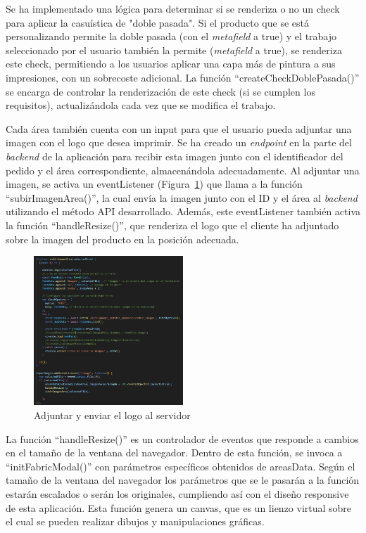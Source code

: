 \documentclass[11pt]{article}
\begin{document}
Se ha implementado una lógica para determinar si se renderiza o no un check para aplicar la casuística de "doble pasada". Si el producto que se está 
personalizando permite la doble pasada (con el \textit{metafield} a true) y el trabajo seleccionado por el usuario también la permite 
(\textit{metafield} a true), se renderiza este check, permitiendo a los usuarios aplicar una capa más de pintura a sus impresiones, 
con un sobrecoste adicional. La función ``createCheckDoblePasada()'' se encarga de controlar la renderización de este check (si se cumplen los requisitos), 
actualizándola cada vez que se modifica el trabajo.

Cada área también cuenta con un input para que el usuario pueda adjuntar una imagen con el logo que desea imprimir. Se ha creado un \textit{endpoint} en 
la parte del \textit{backend} de la aplicación para recibir esta imagen junto con el identificador del pedido y el área correspondiente, 
almacenándola adecuadamente. Al adjuntar una imagen, se activa un eventListener (Figura~\ref{fig:adjuntarLogo}) que llama a la función ``subirImagenArea()'', 
la cual envía la imagen junto con el ID y el área al \textit{backend} utilizando el método API desarrollado. Además, este eventListener 
también activa la función ``handleResize()'', que renderiza el logo que el cliente ha adjuntado sobre la imagen del producto en la posición adecuada.

\begin{figure}[H]
    \centering
    \includegraphics[width=0.5\textwidth]{imagenesUS3-modal/AdjuntarLogoFetch.png}
    \caption{\label{fig:adjuntarLogo} Adjuntar y enviar el logo al servidor}
    \vspace{\fill}
\end{figure}


La función ``handleResize()'' es un controlador de eventos que responde a cambios en el tamaño de la ventana del navegador. 
Dentro de esta función, se invoca a ``initFabricModal()'' con parámetros específicos obtenidos de areasData. Según el tamaño de la ventana del navegador
los parámetros que se le pasarán a la función estarán escalados o serán los originales, cumpliendo así con el diseño responsive de esta aplicación. 
Esta función genera un canvas, que es un lienzo virtual sobre el cual se pueden realizar dibujos y manipulaciones gráficas.
\end{document}
